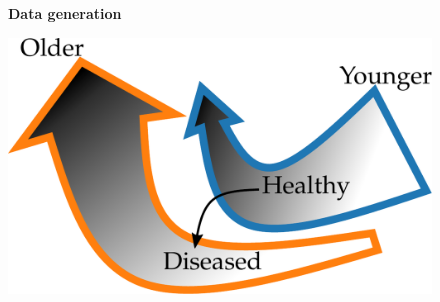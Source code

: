 \documentclass[a4paper,num-refs]{oup-contemporary}
\begin{document}
\begin{figure}[t!]
  \centering
  \begin{minipage}{.44\textwidth}
    \centerline{\sffamily\bfseries Data generation}

    \hspace*{.05\linewidth}%
    \includegraphics[width=.6\textwidth]{figures/drawings/parabolas_schema.pdf}


\end{minipage}
\end{figure}
\end{document}
